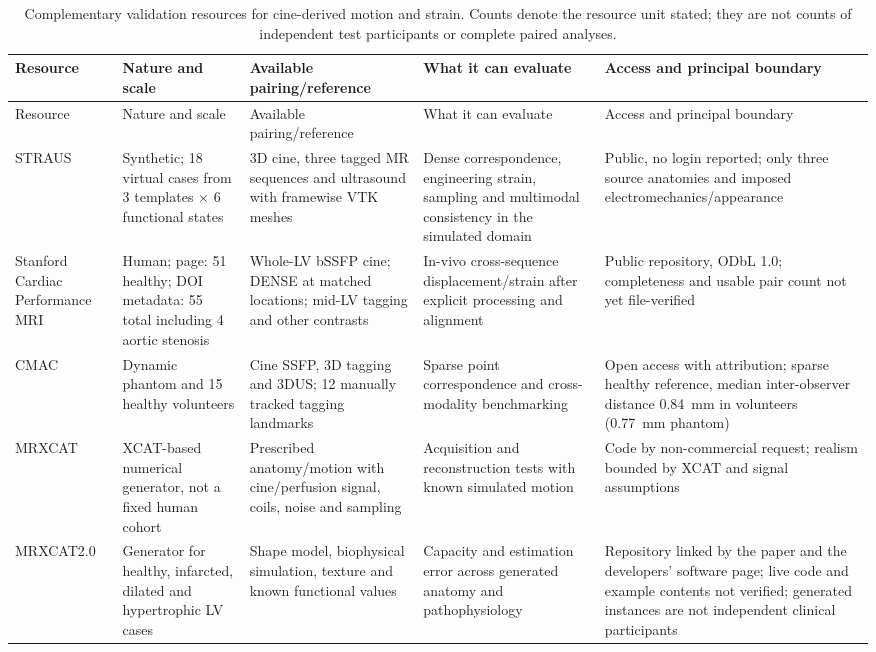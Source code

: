 \Needspace{100mm}
{\scriptsize\sloppy
\setlength{\tabcolsep}{3pt}
\begin{longtable}{L{0.139\textwidth}L{0.162\textwidth}L{0.208\textwidth}L{0.185\textwidth}L{0.231\textwidth}}
\caption{Complementary validation resources for cine-derived motion and strain. Counts denote the resource unit stated; they are not counts of independent test participants or complete paired analyses.}\label{tab:resources}\\
\toprule
Resource & Nature and scale & Available pairing/reference & What it can evaluate & Access and principal boundary \\
\midrule
\endfirsthead
\toprule
Resource & Nature and scale & Available pairing/reference & What it can evaluate & Access and principal boundary \\
\midrule
\endhead
STRAUS~\cite{zhou2018straus,strausdata} & Synthetic; 18 virtual cases from 3 templates $\times$ 6 functional states & 3D cine, three tagged MR sequences and ultrasound with framewise VTK meshes & Dense correspondence, engineering strain, sampling and multimodal consistency in the simulated domain & Public, no login reported; only three source anatomies and imposed electromechanics/appearance \\
\addlinespace
Stanford Cardiac Performance MRI~\cite{stanforddata} & Human; page: 51 healthy; DOI metadata: 55 total including 4 aortic stenosis & Whole-LV bSSFP cine; DENSE at matched locations; mid-LV tagging and other contrasts & In-vivo cross-sequence displacement/strain after explicit processing and alignment & Public repository, ODbL 1.0; completeness and usable pair count not yet file-verified \\
\addlinespace
CMAC~\cite{tobongomez2013cmac,cmac2011} & Dynamic phantom and 15 healthy volunteers & Cine SSFP, 3D tagging and 3DUS; 12 manually tracked tagging landmarks & Sparse point correspondence and cross-modality benchmarking & Open access with attribution; sparse healthy reference, median inter-observer distance 0.84~mm in volunteers (0.77~mm phantom) \\
\addlinespace
MRXCAT~\cite{wissmann2014mrxcat} & XCAT-based numerical generator, not a fixed human cohort & Prescribed anatomy/motion with cine/perfusion signal, coils, noise and sampling & Acquisition and reconstruction tests with known simulated motion & Code by non-commercial request; realism bounded by XCAT and signal assumptions \\
\addlinespace
MRXCAT2.0\newline\cite{mrxcat2023,mrxcat2repo} & Generator for healthy, infarcted, dilated and hypertrophic LV cases & Shape model, biophysical simulation, texture and known functional values & Capacity and estimation error across generated anatomy and patho\-physiology & Repository linked by the paper and the developers' software page; live code and example contents not verified; generated instances are not independent clinical participants \\

\end{longtable}}
